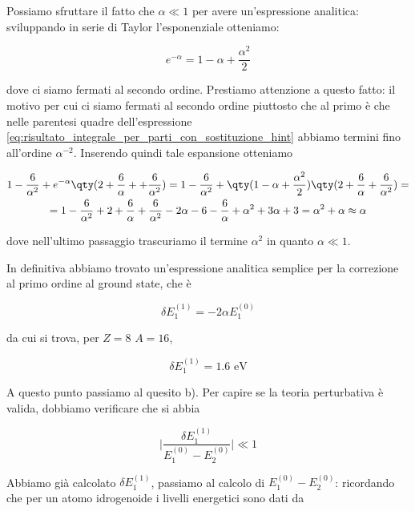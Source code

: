 \begin{soluzione}
   Possiamo sfruttare il fatto che $\alpha \ll 1$ per avere un'espressione analitica: sviluppando in serie di Taylor l'esponenziale otteniamo:
   
   \begin{equation*}
      e^{-\alpha}
      =1 - \alpha + \frac{\alpha^2}{2}
   \end{equation*}

   dove ci siamo fermati al secondo ordine. Prestiamo attenzione a questo fatto: il motivo per cui ci siamo fermati al secondo ordine piuttosto che al primo è che nelle parentesi quadre dell'espressione \eqref{eq:risultato_integrale_per_parti_con_sostituzione_hint} abbiamo termini fino all'ordine $\alpha^{-2}$. Inserendo quindi tale espansione otteniamo

   \begin{gather*}
      1 - \frac{6}{\alpha^2} + e^{-\alpha}\qty( 2 + \frac{6}{\alpha} + + \frac{6}{\alpha^2} )
   =1 - \frac{6}{\alpha^2} + \qty( 1 - \alpha + \frac{\alpha^2}{2} )\qty( 2 + \frac{6}{\alpha} + \frac{6}{\alpha^2} )
   =\\
   =1 - \frac{6}{\alpha^2} + 2 +\frac{6}{\alpha} + \frac{6}{\alpha^2} - 2\alpha - 6 - \frac{6}{\alpha} + \alpha^2 + 3\alpha + 3
   =\alpha^2 + \alpha \approx \alpha
   \end{gather*}
   
   dove nell'ultimo passaggio trascuriamo il termine $\alpha^2$ in quanto $\alpha \ll 1$.

   In definitiva abbiamo trovato un'espressione analitica semplice per la correzione al primo ordine al ground state, che è

   \begin{equation*}
      \delta E_1^{(1)}=-2 \alpha E_1^{(0)}
   \end{equation*}

   da cui si trova, per $Z=8$ $A=16$,

   \begin{equation*}
      \delta E_1^{(1)}=1.6 \text{ eV}
   \end{equation*}

   A questo punto passiamo al quesito b). Per capire se la teoria perturbativa è valida, dobbiamo verificare che si abbia

   \begin{equation*}
      \biggl| \frac{ \delta E_1^{(1)} }{ E_1^{(0)} - E_{2}^{(0)} } \biggr| \ll 1
   \end{equation*}

   Abbiamo già calcolato $\delta E_1^{(1)}$, passiamo al calcolo di $E_1^{(0)} - E_{2}^{(0)}$: ricordando che per un atomo idrogenoide i livelli energetici sono dati da


\end{soluzione}
